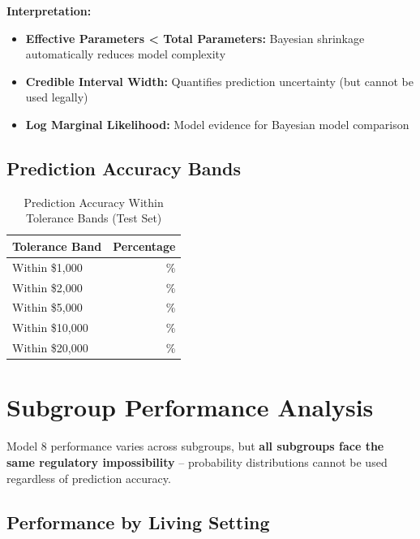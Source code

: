 \textbf{Interpretation:}
\begin{itemize}
    \item \textbf{Effective Parameters < Total Parameters:} Bayesian shrinkage automatically reduces model complexity
    \item \textbf{Credible Interval Width:} Quantifies prediction uncertainty (but cannot be used legally)
    \item \textbf{Log Marginal Likelihood:} Model evidence for Bayesian model comparison
\end{itemize}

\subsection{Prediction Accuracy Bands}

\begin{table}[h]
\centering
\caption{Prediction Accuracy Within Tolerance Bands (Test Set)}
\begin{tabular}{lr}
\toprule
\textbf{Tolerance Band} & \textbf{Percentage} \\
\midrule
Within \$1,000 & \ModelEightWithinOneK{}\% \\
Within \$2,000 & \ModelEightWithinTwoK{}\% \\
Within \$5,000 & \ModelEightWithinFiveK{}\% \\
Within \$10,000 & \ModelEightWithinTenK{}\% \\
Within \$20,000 & \ModelEightWithinTwentyK{}\% \\
\bottomrule
\end{tabular}
\end{table}


\section{Subgroup Performance Analysis}

Model 8 performance varies across subgroups, but \textbf{all subgroups face the same regulatory impossibility} -- probability distributions cannot be used regardless of prediction accuracy.

\subsection{Performance by Living Setting}

